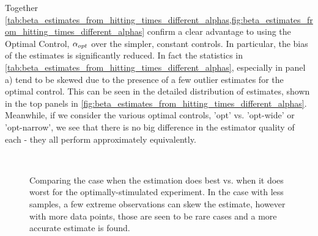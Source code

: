 \documentclass{article}
\begin{document}
Together
\cref{tab:beta_estimates_from_hitting_times_different_alphas,fig:beta_estimates_from_hitting_times_different_alphas}
confirm a clear advantage to using the Optimal Control, ${\alpha}_{opt}$ over the
simpler, constant controls. In particular, the bias of the estimates is
significantly reduced. 
In fact the statistics in
\cref{tab:beta_estimates_from_hitting_times_different_alphas}, especially in
panel a) tend to be skewed due to the presence of a few outlier estimates for
the optimal control. This can be seen in the detailed distribution of estimates,
shown in the top panels in
\cref{fig:beta_estimates_from_hitting_times_different_alphas}.
Meanwhile, if we consider the various optimal
controls, 'opt' vs. 'opt-wide' or 'opt-narrow', we see that there is no big
difference in the estimator quality of each - they all perform approximately
equivalently.

\begin{figure}[h]
\begin{center} 
\\
\caption[Estimation Detail View for the Optimally-Stimulated
Experiment]{Comparing the case when the estimation does best vs. when it does
worst for the optimally-stimulated experiment. In the case with less samples, a
few extreme observations can skew the estimate, however with more data points,
those are seen to be rare cases and a more accurate estimate is found.}
\label{fig:batch_estimtion_in_detail}
\end{center}
\end{figure}
\end{document}
